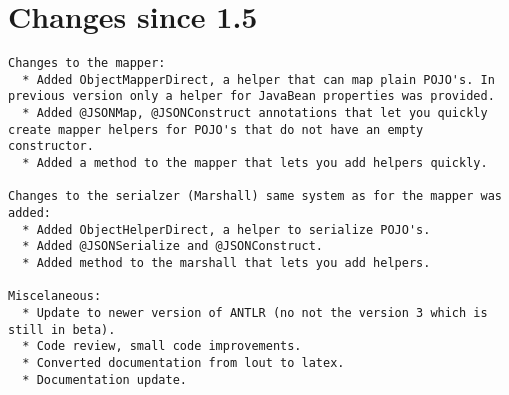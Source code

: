 \documentclass[a4paper]{article}
\begin{document}
\section{Changes since 1.5}
\begin{verbatim}
Changes to the mapper:
  * Added ObjectMapperDirect, a helper that can map plain POJO's. In previous version only a helper for JavaBean properties was provided.
  * Added @JSONMap, @JSONConstruct annotations that let you quickly create mapper helpers for POJO's that do not have an empty constructor.
  * Added a method to the mapper that lets you add helpers quickly.

Changes to the serialzer (Marshall) same system as for the mapper was added:
  * Added ObjectHelperDirect, a helper to serialize POJO's. 
  * Added @JSONSerialize and @JSONConstruct.
  * Added method to the marshall that lets you add helpers.

Miscelaneous:
  * Update to newer version of ANTLR (no not the version 3 which is still in beta).
  * Code review, small code improvements.
  * Converted documentation from lout to latex. 
  * Documentation update.
\end{verbatim}
 
\end{document}
